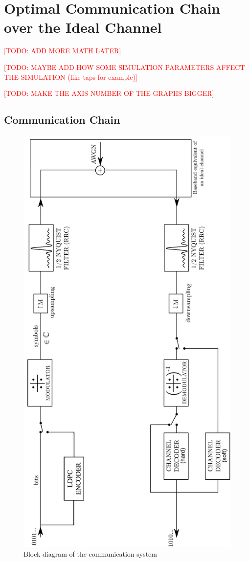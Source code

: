 \section{Optimal Communication Chain over the Ideal Channel}
\textcolor{red}{[TODO: ADD MORE MATH LATER]}\par
\textcolor{red}{[TODO: MAYBE ADD HOW SOME SIMULATION PARAMETERS AFFECT THE SIMULATION (like taps for example)]}\par
\textcolor{red}{[TODO: MAKE THE AXIS NUMBER OF THE GRAPHS BIGGER]}\par

\subsection{Communication Chain}
\begin{figure}[H]
	\centering
	\includegraphics[angle=-90, width=0.9\linewidth]{Images/com-chain} %
	\caption{Block diagram of the communication system}
	\label{fig:com-chain}
\end{figure}
